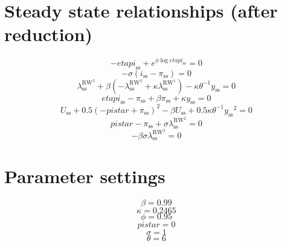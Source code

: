 \section{Steady state relationships (after reduction)}

\begin{equation}
-{e\!t\!a\!p\!i}_\mathrm{ss} + e^{{\phi} {\log{{e\!t\!a\!p\!i}_\mathrm{ss}}}} = 0
\end{equation}
\begin{equation}
-{\sigma} \left(i_\mathrm{ss} - \pi_\mathrm{ss}\right) = 0
\end{equation}
\begin{equation}
\lambda^{\mathrm{RW}^{\mathrm{2}}}_\mathrm{ss} + {\beta} \left(-\lambda^{\mathrm{RW}^{\mathrm{2}}}_\mathrm{ss} + {\kappa} {\lambda^{\mathrm{RW}^{\mathrm{1}}}_\mathrm{ss}}\right) - {\kappa} {\theta}^{-1} {y_\mathrm{ss}} = 0
\end{equation}
\begin{equation}
{e\!t\!a\!p\!i}_\mathrm{ss} - \pi_\mathrm{ss} + {\beta} {\pi_\mathrm{ss}} + {\kappa} {y_\mathrm{ss}} = 0
\end{equation}
\begin{equation}
U_\mathrm{ss} + 0.5\left(-{p\!i\!s\!t\!a\!r} + \pi_\mathrm{ss}\right)^{2} - {\beta} {U_\mathrm{ss}} + 0.5{\kappa} {\theta}^{-1} {y_\mathrm{ss}}^{2} = 0
\end{equation}
\begin{equation}
{p\!i\!s\!t\!a\!r} - \pi_\mathrm{ss} + {\sigma} {\lambda^{\mathrm{RW}^{\mathrm{2}}}_\mathrm{ss}} = 0
\end{equation}
\begin{equation}
-{\beta} {\sigma} {\lambda^{\mathrm{RW}^{\mathrm{2}}}_\mathrm{ss}} = 0
\end{equation}






\section{Parameter settings}

\begin{equation}
\beta = 0.99
\end{equation}
\begin{equation}
\kappa = 0.2465
\end{equation}
\begin{equation}
\phi = 0.95
\end{equation}
\begin{equation}
{p\!i\!s\!t\!a\!r} = 0
\end{equation}
\begin{equation}
\sigma = 1
\end{equation}
\begin{equation}
\theta = 6
\end{equation}


